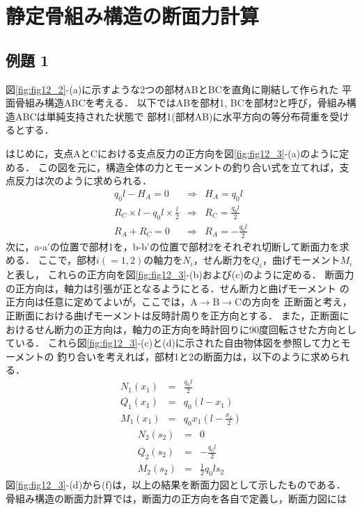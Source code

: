 ﻿\documentclass[10pt,a4j]{jbook}
\begin{document}
\section{静定骨組み構造の断面力計算}
\subsection{例題 1}
図\ref{fig:fig12_2}-(a)に示すような2つの部材ABとBCを直角に剛結して作られた
平面骨組み構造ABCを考える．
以下ではABを部材1, BCを部材2と呼び，骨組み構造ABCは単純支持された状態で
部材1(部材AB)に水平方向の等分布荷重を受けるとする．

はじめに，支点AとCにおける支点反力の正方向を図\ref{fig:fig12_3}-(a)のように定める．
この図を元に，構造全体の力とモーメントの釣り合い式を立てれば，支点反力は次のように求められる．
\begin{eqnarray}
	q_0l-H_A=0 & \Rightarrow & H_A=q_0l \\ 
	R_C\times l -q_0l \times \frac{l}{2}
	 & \Rightarrow & R_C=\frac{q_0l}{2} \\ 
	R_A+R_C=0 &\Rightarrow& R_A=-\frac{q_0l}{2}
\end{eqnarray}
次に，a-a'の位置で部材1を，b-b'の位置で部材2をそれぞれ切断して断面力を求める．
ここで，部材$i(=1,2)$の軸力を$N_i$，せん断力を$Q_i$，曲げモーメント$M_i$と表し，
これらの正方向を図\ref{fig:fig12_3}-(b)および(c)のように定める．
断面力の正方向は，軸力は引張が正となるようにとる．せん断力と曲げモーメント
の正方向は任意に定めてよいが，ここでは，A$\rightarrow$B$\rightarrow$Cの方向を
正断面と考え，正断面における曲げモーメントは反時計周りを正方向とする．
また，正断面におけるせん断力の正方向は，軸力の正方向を時計回りに90度回転させた方向としている．
これら図\ref{fig:fig12_3}-(c)と(d)に示された自由物体図を参照して力とモーメントの
釣り合いを考えれば，部材1と2の断面力は，以下のように求められる．
\begin{eqnarray}
	N_1(x_1) &= & \frac{q_0l}{2}  
	\\
	Q_1(x_1) &= & q_0(l-x_1)
	\\
	M_1(x_1) &= & q_0x_1\left(l-\frac{x_1}{2}\right)
\end{eqnarray}
\begin{eqnarray}
	N_2(s_2) &= & 0
	\\
	Q_2(s_2) &= & -\frac{q_0l}{2}
	\\
	M_2(s_2) &= & \frac{1}{2}q_0ls_2
\end{eqnarray}
図\ref{fig:fig12_3}-(d)から(f)は，以上の結果を断面力図として示したものである．
骨組み構造の断面力計算では，断面力の正方向を各自で定義し，断面力図には
\end{document}
